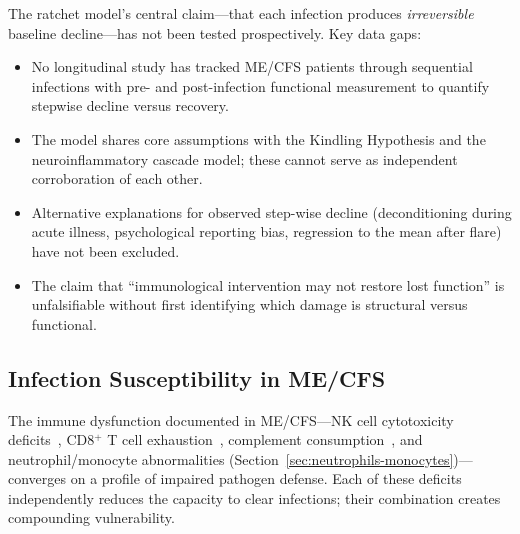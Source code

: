 \begin{limitation}
The ratchet model's central claim---that each infection produces \emph{irreversible} baseline decline---has not been tested prospectively. Key data gaps:
\begin{itemize}
    \item No longitudinal study has tracked ME/CFS patients through sequential infections with pre- and post-infection functional measurement to quantify stepwise decline versus recovery.
    \item The model shares core assumptions with the Kindling Hypothesis and the neuroinflammatory cascade model; these cannot serve as independent corroboration of each other.
    \item Alternative explanations for observed step-wise decline (deconditioning during acute illness, psychological reporting bias, regression to the mean after flare) have not been excluded.
    \item The claim that ``immunological intervention may not restore lost function'' is unfalsifiable without first identifying which damage is structural versus functional.
\end{itemize}
\end{limitation}

\subsection{Infection Susceptibility in ME/CFS}
\label{sec:infection-susceptibility}

The immune dysfunction documented in ME/CFS---NK cell cytotoxicity deficits~\cite{Caligiuri1987nk,EatonFitch2019}, CD8$^+$ T cell exhaustion~\cite{iu2024tcell_exhaustion,Gil2023cd8}, complement consumption~\cite{EatonFitch2019,Sorensen2003complement}, and neutrophil/monocyte abnormalities (Section~\ref{sec:neutrophils-monocytes})---converges on a profile of impaired pathogen defense. Each of these deficits independently reduces the capacity to clear infections; their combination creates compounding vulnerability.


